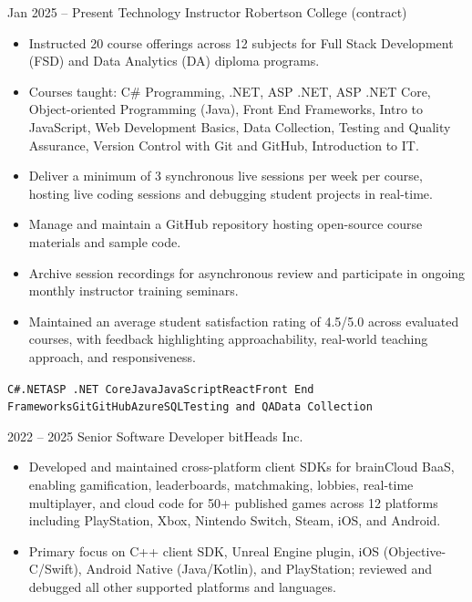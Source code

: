 \documentclass[9pt]{developercv}
\begin{document}
\begin{entrylist}
	\entry
		{Jan 2025 -- Present}
		{Technology Instructor}
		{Robertson College (contract)}
		{\begin{itemize}[noitemsep,topsep=2pt,leftmargin=1em,parsep=0pt]
			  \item Instructed 20 course offerings across 12 subjects for Full Stack Development (FSD) and Data Analytics (DA) diploma programs.
			  \item Courses taught: C\# Programming, .NET, ASP .NET, ASP .NET Core, Object-oriented Programming (Java), Front End Frameworks, Intro to JavaScript, Web Development Basics, Data Collection, Testing and Quality Assurance, Version Control with Git and GitHub, Introduction to IT.
			  \item Deliver a minimum of 3 synchronous live sessions per week per course, hosting live coding sessions and debugging student projects in real-time.
			  \item Manage and maintain a GitHub repository hosting open-source course materials and sample code.
			  \item Archive session recordings for asynchronous review and participate in ongoing monthly instructor training seminars.
			  \item Maintained an average student satisfaction rating of 4.5/5.0 across evaluated courses, with feedback highlighting approachability, real-world teaching approach, and responsiveness.
			\end{itemize}
			\texttt{C\#}\slashsep\texttt{.NET}\slashsep\texttt{ASP .NET Core}\slashsep\texttt{Java}\slashsep\texttt{JavaScript}\slashsep\texttt{React}\slashsep\texttt{Front End Frameworks}\slashsep\texttt{Git}\slashsep\texttt{GitHub}\slashsep\texttt{Azure}\slashsep\texttt{SQL}\slashsep\texttt{Testing and QA}\slashsep\texttt{Data Collection}}
	\entry
		{2022 -- 2025}
		{Senior Software Developer}
		{bitHeads Inc.}
		{\begin{itemize}[noitemsep,topsep=2pt,leftmargin=1em,parsep=0pt]
			  \item Developed and maintained cross-platform client SDKs for brainCloud BaaS, enabling gamification, leaderboards, matchmaking, lobbies, real-time multiplayer, and cloud code for 50+ published games across 12 platforms including PlayStation, Xbox, Nintendo Switch, Steam, iOS, and Android.
			  \item Primary focus on C++ client SDK, Unreal Engine plugin, iOS (Objective-C/Swift), Android Native (Java/Kotlin), and PlayStation; reviewed and debugged all other supported platforms and languages.

\end{itemize}}
\end{entrylist}
\end{document}
